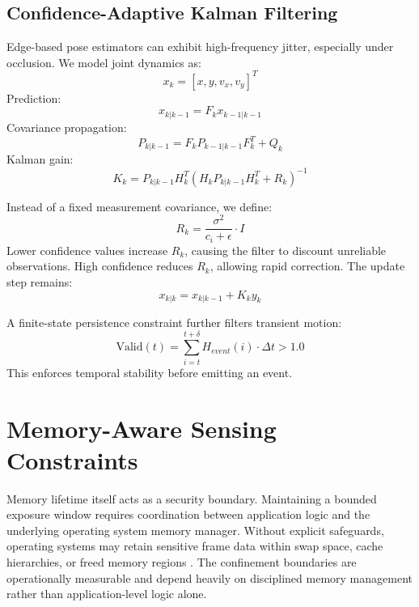 \documentclass[conference]{IEEEtran}
\begin{document}
\subsection{Confidence-Adaptive Kalman Filtering}
Edge-based pose estimators can exhibit high-frequency jitter, especially under occlusion. We model joint dynamics as:
\begin{equation}
x_k = [x, y, v_x, v_y]^T
\end{equation}
Prediction:
\begin{equation}
x_{k|k-1} = F_k x_{k-1|k-1}
\end{equation}
Covariance propagation:
\begin{equation}
P_{k|k-1} = F_k P_{k-1|k-1} F_k^T + Q_k
\end{equation}
Kalman gain:
\begin{equation}
K_k = P_{k|k-1} H_k^T (H_k P_{k|k-1} H_k^T + R_k)^{-1}
\end{equation}

Instead of a fixed measurement covariance, we define:
\begin{equation}
R_k = \frac{\sigma^2}{c_i + \epsilon} \cdot I
\end{equation}
Lower confidence values increase $R_k$, causing the filter to discount unreliable observations. High confidence reduces $R_k$, allowing rapid correction. The update step remains:
\begin{equation}
x_{k|k} = x_{k|k-1} + K_k y_k
\end{equation}

A finite-state persistence constraint further filters transient motion:
\begin{equation}
\text{Valid}(t) = \sum_{i=t}^{t+\delta} H_{event}(i) \cdot \Delta t > 1.0
\end{equation}
This enforces temporal stability before emitting an event.

\section{Memory-Aware Sensing Constraints}

Memory lifetime itself acts as a security boundary. Maintaining a bounded exposure window requires coordination between application logic and the underlying operating system memory manager. Without explicit safeguards, operating systems may retain sensitive frame data within swap space, cache hierarchies, or freed memory regions \cite{b21, b22}. The confinement boundaries are operationally measurable and depend heavily on disciplined memory management rather than application-level logic alone.
\end{document}
